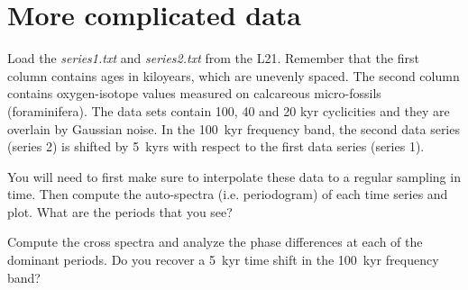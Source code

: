 \documentclass[10pt,fleqn]{article}
\begin{document}
\section*{More complicated data}

Load the \textit{series1.txt} and \textit{series2.txt} from the L21. Remember that the first column contains ages in kiloyears, which are unevenly spaced. The second column contains oxygen-isotope values measured on calcareous micro-fossils (foraminifera). The data sets contain 100, 40 and 20 kyr cyclicities and they are overlain by Gaussian noise. In the 100~kyr frequency band, the second data series (series 2) is shifted by 5~kyrs with respect to the first data series (series 1).

You will need to first make sure to interpolate these data to a regular sampling in time. Then compute the auto-spectra (i.e. periodogram) of each time series and plot. What are the periods that you see?

Compute the cross spectra and analyze the phase differences at each of the dominant periods. Do you recover a 5~kyr time shift in the 100~kyr frequency band?
\end{document}
